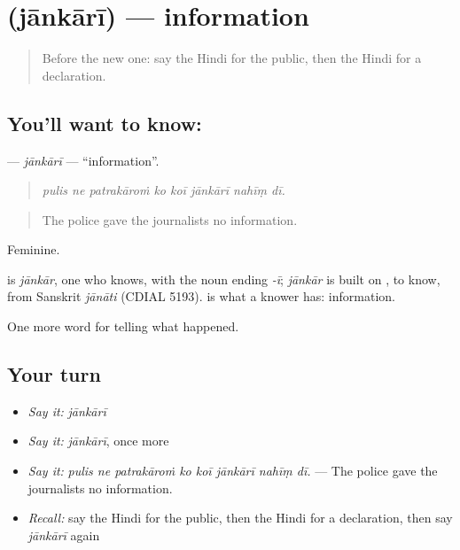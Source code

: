 \section[\texorpdfstring{\hi{जानकारी} (jānkārī)}{जानकारी (jānkārī)}]{ (jānkārī) — information}

\label{lesson:HI-C315-jankari}



\begin{quote}
Before the new one: say the Hindi for the public, then the Hindi for a declaration.
\end{quote}

\subsection*{You'll want to know: }
\textbf{} — \emph{jānkārī} — \textquotedblleft{}information\textquotedblright{}.

\begin{quote}
       
\end{quote}

\begin{quote}
\emph{pulis ne patrakāroṁ ko koī jānkārī nahīṃ dī.}
\end{quote}

\begin{quote}
The police gave the journalists no information.
\end{quote}

Feminine.

\begin{cousinweb}
is \emph{jānkār}, one who knows, with the noun ending \emph{-ī}; \emph{jānkār} is built on \textbf{}, to know, from Sanskrit \emph{jānāti} (CDIAL 5193). \textbf{} is what a knower has: information.
\end{cousinweb}

\begin{grammarlens}[title={What you've built}]
One more word for telling what happened.
\end{grammarlens}

\subsection*{Your turn}
\begin{itemize}
\raggedright
  \item \emph{Say it:} \emph{jānkārī}
  \item \emph{Say it:} \emph{jānkārī}, once more
  \item \emph{Say it:} \emph{pulis ne patrakāroṁ ko koī jānkārī nahīṃ dī.} — The police gave the journalists no information.
  \item \emph{Recall:} say the Hindi for the public, then the Hindi for a declaration, then say \emph{jānkārī} again
\end{itemize}


